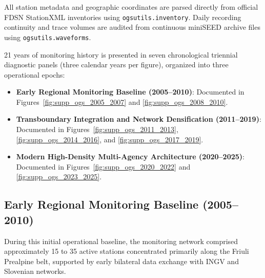 All station metadata and geographic coordinates are parsed directly from
official \ac{FDSN} StationXML inventories using
\texttt{ogsutils.inventory}. Daily
recording continuity and trace volumes are audited from continuous miniSEED
archive files using \texttt{ogsutils.waveforms}.

\num{21} years of monitoring history is presented in seven chronological
triennial diagnostic panels (three calendar years per figure), organized into
three operational epochs:
\begin{itemize}[leftmargin=*,itemsep=2pt]
  \item \textbf{Early Regional Monitoring Baseline (2005--2010)}: Documented in
    Figures~\ref{fig:supp_ogs_2005_2007} and \ref{fig:supp_ogs_2008_2010}.
  \item \textbf{Transboundary Integration and Network Densification
    (2011--2019)}: Documented in Figures~\ref{fig:supp_ogs_2011_2013},
    \ref{fig:supp_ogs_2014_2016}, and \ref{fig:supp_ogs_2017_2019}.
  \item \textbf{Modern High-Density Multi-Agency Architecture (2020--2025)}:
    Documented in Figures~\ref{fig:supp_ogs_2020_2022} and
    \ref{fig:supp_ogs_2023_2025}.
\end{itemize}

\clearpage


\subsection*{Early Regional Monitoring Baseline (2005--2010)}
During this initial operational baseline, the monitoring network comprised
approximately 15 to 35 active stations concentrated primarily along the Friuli
Prealpine belt, supported by early bilateral data exchange with \ac{INGV} and
Slovenian networks.

